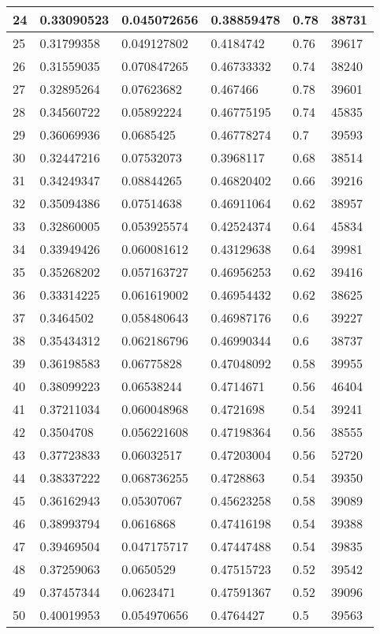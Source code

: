 \begin{longtable}{|l|l|l|l|l|l|}
24 & 0.33090523 & 0.045072656 & 0.38859478 & 0.78 & 38731 \\ \hline 
25 & 0.31799358 & 0.049127802 & 0.4184742 & 0.76 & 39617 \\ \hline 
26 & 0.31559035 & 0.070847265 & 0.46733332 & 0.74 & 38240 \\ \hline 
27 & 0.32895264 & 0.07623682 & 0.467466 & 0.78 & 39601 \\ \hline 
28 & 0.34560722 & 0.05892224 & 0.46775195 & 0.74 & 45835 \\ \hline 
29 & 0.36069936 & 0.0685425 & 0.46778274 & 0.7 & 39593 \\ \hline 
30 & 0.32447216 & 0.07532073 & 0.3968117 & 0.68 & 38514 \\ \hline 
31 & 0.34249347 & 0.08844265 & 0.46820402 & 0.66 & 39216 \\ \hline 
32 & 0.35094386 & 0.07514638 & 0.46911064 & 0.62 & 38957 \\ \hline 
33 & 0.32860005 & 0.053925574 & 0.42524374 & 0.64 & 45834 \\ \hline 
34 & 0.33949426 & 0.060081612 & 0.43129638 & 0.64 & 39981 \\ \hline 
35 & 0.35268202 & 0.057163727 & 0.46956253 & 0.62 & 39416 \\ \hline 
36 & 0.33314225 & 0.061619002 & 0.46954432 & 0.62 & 38625 \\ \hline 
37 & 0.3464502 & 0.058480643 & 0.46987176 & 0.6 & 39227 \\ \hline 
38 & 0.35434312 & 0.062186796 & 0.46990344 & 0.6 & 38737 \\ \hline 
39 & 0.36198583 & 0.06775828 & 0.47048092 & 0.58 & 39955 \\ \hline 
40 & 0.38099223 & 0.06538244 & 0.4714671 & 0.56 & 46404 \\ \hline 
41 & 0.37211034 & 0.060048968 & 0.4721698 & 0.54 & 39241 \\ \hline 
42 & 0.3504708 & 0.056221608 & 0.47198364 & 0.56 & 38555 \\ \hline 
43 & 0.37723833 & 0.06032517 & 0.47203004 & 0.56 & 52720 \\ \hline 
44 & 0.38337222 & 0.068736255 & 0.4728863 & 0.54 & 39350 \\ \hline 
45 & 0.36162943 & 0.05307067 & 0.45623258 & 0.58 & 39089 \\ \hline 
46 & 0.38993794 & 0.0616868 & 0.47416198 & 0.54 & 39388 \\ \hline 
47 & 0.39469504 & 0.047175717 & 0.47447488 & 0.54 & 39835 \\ \hline 
48 & 0.37259063 & 0.0650529 & 0.47515723 & 0.52 & 39542 \\ \hline 
49 & 0.37457344 & 0.0623471 & 0.47591367 & 0.52 & 39096 \\ \hline 
50 & 0.40019953 & 0.054970656 & 0.4764427 & 0.5 & 39563 \\ \hline 
\end{longtable}